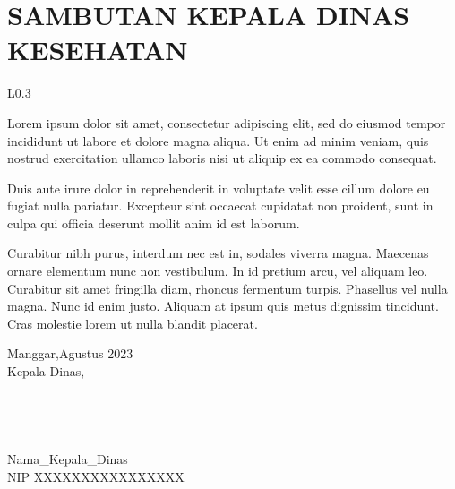 {}
\section*{SAMBUTAN KEPALA DINAS KESEHATAN \namaKabupatenKapital }
\begingroup
\setlength\intextsep{0pt}
\begin{wrapfigure}{L}{0.3\textwidth}
    \centering
\end{wrapfigure}

Lorem ipsum dolor sit amet, consectetur adipiscing elit, sed do eiusmod tempor incididunt ut labore et dolore magna aliqua. Ut enim ad minim veniam, quis nostrud exercitation ullamco laboris nisi ut aliquip ex ea commodo consequat.

Duis aute irure dolor in reprehenderit in voluptate velit esse cillum dolore eu fugiat nulla pariatur. Excepteur sint occaecat cupidatat non proident, sunt in culpa qui officia deserunt mollit anim id est laborum.
\endgroup

Curabitur nibh purus, interdum nec est in, sodales viverra magna. Maecenas ornare elementum nunc non vestibulum. In id pretium arcu, vel aliquam leo. Curabitur sit amet fringilla diam, rhoncus fermentum turpis. Phasellus vel nulla magna. Nunc id enim justo. Aliquam at ipsum quis metus dignissim tincidunt. Cras molestie lorem ut nulla blandit placerat.

\vspace*{4ex}
\noindent Manggar,\hspace{3em}Agustus 2023\\
Kepala Dinas,\\
\\
\\
\\
\\
Nama_Kepala_Dinas\\
NIP XXXXXXXXXXXXXXXX 


\leftskip 0pt
